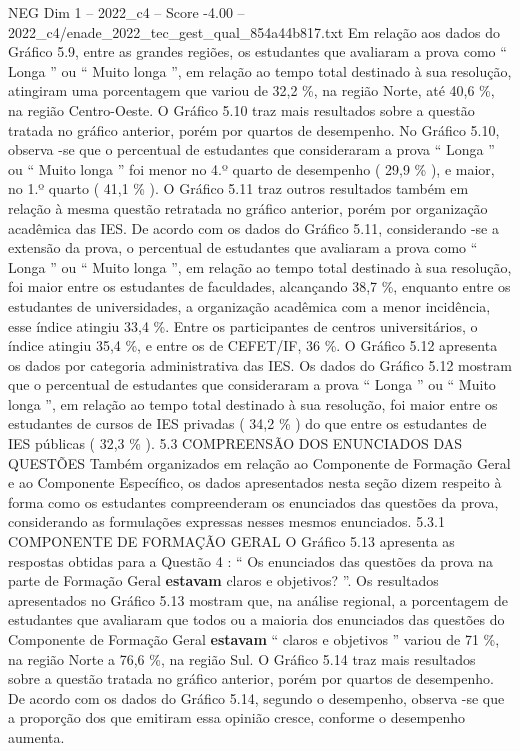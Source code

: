 \begin{textsample}{NEG Dim 1 – 2022\_c4 – Score -4.00 – 2022\_c4/enade\_2022\_tec\_gest\_qual\_854a44b817.txt}
Em relação aos dados do Gráfico 5.9, entre as grandes regiões, os estudantes que avaliaram a prova como “ Longa ” ou “ Muito longa ”, em relação ao tempo total destinado à sua resolução, atingiram uma porcentagem que variou de 32,2 \%, na região Norte, até 40,6 \%, na região Centro-Oeste.
O Gráfico 5.10 traz mais resultados sobre a questão tratada no gráfico anterior, porém por quartos de desempenho.
No Gráfico 5.10, observa -se que o percentual de estudantes que consideraram a prova “ Longa ” ou “ Muito longa ” foi menor no 4.º quarto de desempenho ( 29,9 \% ), e maior, no 1.º quarto ( 41,1 \% ).
O Gráfico 5.11 traz outros resultados também em relação à mesma questão retratada no gráfico anterior, porém por organização acadêmica das IES.
De acordo com os dados do Gráfico 5.11, considerando -se a extensão da prova, o percentual de estudantes que avaliaram a prova como “ Longa ” ou “ Muito longa ”, em relação ao tempo total destinado à sua resolução, foi maior entre os estudantes de faculdades, alcançando 38,7 \%, enquanto entre os estudantes de universidades, a organização acadêmica com a menor incidência, esse índice atingiu 33,4 \%.
Entre os participantes de centros universitários, o índice atingiu 35,4 \%, e entre os de CEFET/IF, 36 \%.
O Gráfico 5.12 apresenta os dados por categoria administrativa das IES.
Os dados do Gráfico 5.12 mostram que o percentual de estudantes que consideraram a prova “ Longa ” ou “ Muito longa ”, em relação ao tempo total destinado à sua resolução, foi maior entre os estudantes de cursos de IES privadas ( 34,2 \% ) do que entre os estudantes de IES públicas ( 32,3 \% ). 5.3 COMPREENSÃO DOS ENUNCIADOS DAS QUESTÕES Também organizados em relação ao Componente de Formação Geral e ao Componente Específico, os dados apresentados nesta seção dizem respeito à forma como os estudantes compreenderam os enunciados das questões da prova, considerando as formulações expressas nesses mesmos enunciados. 5.3.1 COMPONENTE DE FORMAÇÃO GERAL O Gráfico 5.13 apresenta as respostas obtidas para a Questão 4 : “ Os enunciados das questões da prova na parte de Formação Geral \textbf{estavam} claros e objetivos? ”.
Os resultados apresentados no Gráfico 5.13 mostram que, na análise regional, a porcentagem de estudantes que avaliaram que todos ou a maioria dos enunciados das questões do Componente de Formação Geral \textbf{estavam} “ claros e objetivos ” variou de 71 \%, na região Norte a 76,6 \%, na região Sul.
O Gráfico 5.14 traz mais resultados sobre a questão tratada no gráfico anterior, porém por quartos de desempenho.
De acordo com os dados do Gráfico 5.14, segundo o desempenho, observa -se que a proporção dos que emitiram essa opinião cresce, conforme o desempenho aumenta.

\end{textsample}
